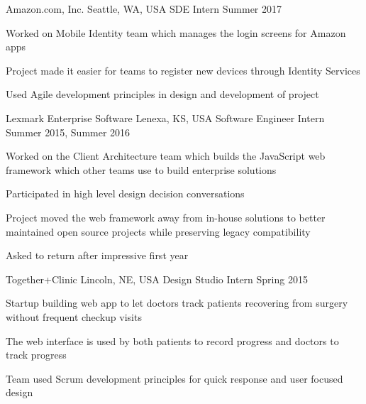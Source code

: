 \documentclass[11pt]{resume}
\begin{document}
\begin{cventries}


\cventry
  {Amazon.com, Inc.}
  {Seattle, WA, USA}
  {SDE Intern}
  {Summer 2017}
  {
    \begin{cvitems}
    \item { Worked on Mobile Identity team which manages the login screens for
            Amazon apps }
    \item { Project made it easier for teams to register new devices through
            Identity Services }
    \item { Used Agile development principles in design and development of
            project }
    \end{cvitems}
  }


\cventry
  {Lexmark Enterprise Software}
  {Lenexa, KS, USA}
  {Software Engineer Intern}
  {Summer 2015, Summer 2016}
  {
    \begin{cvitems}
    \item { Worked on the Client Architecture team which builds the JavaScript
        web framework which other teams use to build enterprise solutions }
    \item { Participated in high level design decision conversations }
    \item { Project moved the web framework away from in-house solutions to
        better maintained open source projects while preserving legacy
        compatibility }
    \item { Asked to return after impressive first year }
    \end{cvitems}
  }


\cventry
  {Together+Clinic}
  {Lincoln, NE, USA}
  {Design Studio Intern}
  {Spring 2015}
  {
    \begin{cvitems}
    \item { Startup building web app to let doctors track patients recovering
        from surgery without frequent checkup visits }
    \item { The web interface is used by both patients to record progress and
        doctors to track progress }
    \item { Team used Scrum development principles for quick response and user
        focused design }
    \end{cvitems}
  }

\end{cventries}
\end{document}
